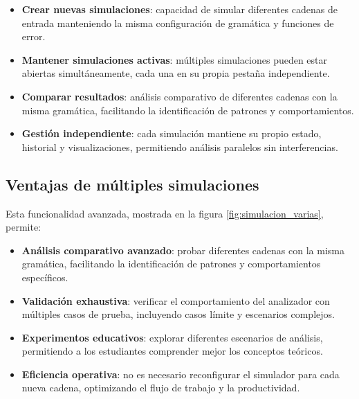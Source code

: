 \begin{itemize}
    \item \textbf{Crear nuevas simulaciones}: capacidad de simular diferentes cadenas de entrada manteniendo la misma configuración de gramática y funciones de error.
    \item \textbf{Mantener simulaciones activas}: múltiples simulaciones pueden estar abiertas simultáneamente, cada una en su propia pestaña independiente.
    \item \textbf{Comparar resultados}: análisis comparativo de diferentes cadenas con la misma gramática, facilitando la identificación de patrones y comportamientos.
    \item \textbf{Gestión independiente}: cada simulación mantiene su propio estado, historial y visualizaciones, permitiendo análisis paralelos sin interferencias.
\end{itemize}

\subsection{Ventajas de múltiples simulaciones}

Esta funcionalidad avanzada, mostrada en la figura \ref{fig:simulacion_varias}, permite:

\begin{itemize}
    \item \textbf{Análisis comparativo avanzado}: probar diferentes cadenas con la misma gramática, facilitando la identificación de patrones y comportamientos específicos.
    \item \textbf{Validación exhaustiva}: verificar el comportamiento del analizador con múltiples casos de prueba, incluyendo casos límite y escenarios complejos.
    \item \textbf{Experimentos educativos}: explorar diferentes escenarios de análisis, permitiendo a los estudiantes comprender mejor los conceptos teóricos.
    \item \textbf{Eficiencia operativa}: no es necesario reconfigurar el simulador para cada nueva cadena, optimizando el flujo de trabajo y la productividad.
\end{itemize}

